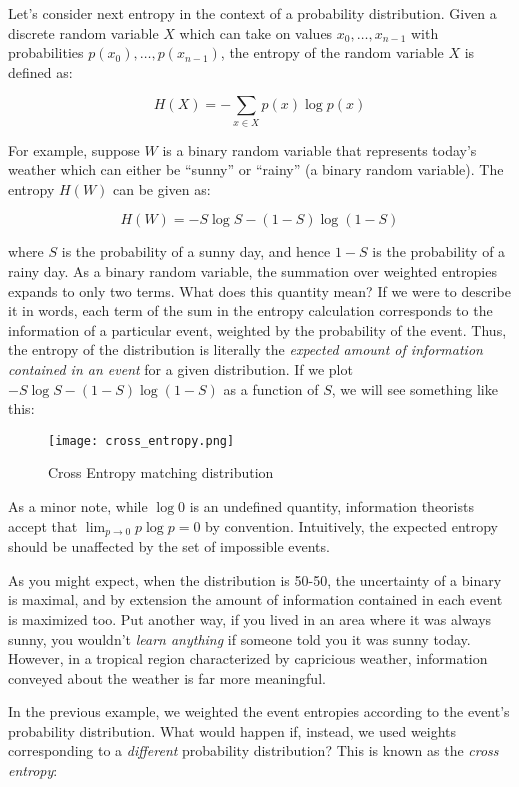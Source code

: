 Let's consider next entropy in the context of a probability
distribution. Given a discrete random variable \(X\) which can take on
values \(x_0, \dots, x_{n-1}\) with probabilities
\(p(x_0), \dots, p(x_{n-1})\), the entropy of the random variable \(X\)
is defined as:

\[H(X) = -\sum_{x \in X} p(x) \log p(x)\]

For example, suppose \(W\) is a binary random variable that represents
today's weather which can either be ``sunny'' or ``rainy'' (a binary
random variable). The entropy \(H(W)\) can be given as:

\[H(W) = -S\log S - (1 - S) \log (1 - S)\]

where \(S\) is the probability of a sunny day, and hence \(1 - S\) is
the probability of a rainy day. As a binary random variable, the
summation over weighted entropies expands to only two terms. What does
this quantity mean? If we were to describe it in words, each term of the
sum in the entropy calculation corresponds to the information of a
particular event, weighted by the probability of the event. Thus, the
entropy of the distribution is literally the \emph{expected amount of
	information contained in an event} for a given distribution. If we plot
\(-S\log S - (1 - S) \log(1 - S)\) as a function of \(S\), we will see
something like this:

\begin{figure}
	\centering
	\texttt{[image: cross\_entropy.png]}
	\caption{Cross Entropy matching distribution}
	\label{fig:cross_entropy} 
\end{figure}

As a minor note, while \(\log 0\) is an undefined quantity, information
theorists accept that \(\lim_{p\rightarrow 0} p\log p = 0\) by
convention. Intuitively, the expected entropy should be unaffected by
the set of impossible events.

As you might expect, when the distribution is 50-50, the uncertainty of
a binary is maximal, and by extension the amount of information
contained in each event is maximized too. Put another way, if you lived
in an area where it was always sunny, you wouldn't \emph{learn anything}
if someone told you it was sunny today. However, in a tropical region
characterized by capricious weather, information conveyed about the
weather is far more meaningful.

In the previous example, we weighted the event entropies according to
the event's probability distribution. What would happen if, instead, we
used weights corresponding to a \emph{different} probability
distribution? This is known as the \emph{cross entropy}:

